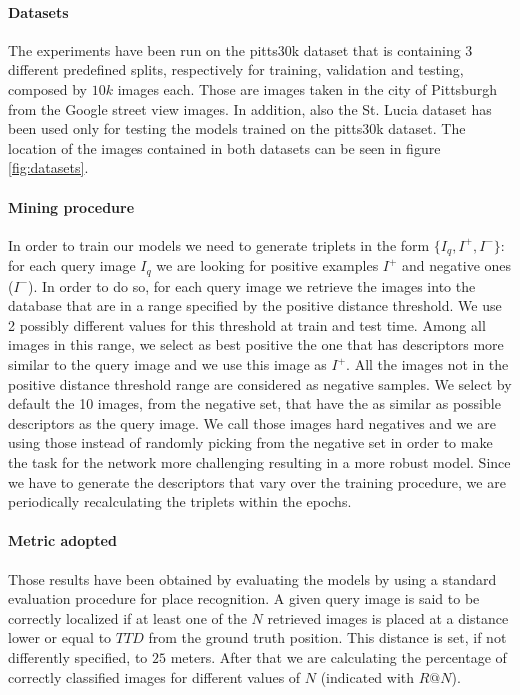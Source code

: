 \documentclass[10pt,twocolumn,letterpaper]{article}
\begin{document}
\paragraph{Datasets}
The experiments have been run on the pitts30k dataset \cite{NETVLAD} that is containing 3 different predefined splits, respectively for 
training, validation and testing, composed by $10k$ images each. Those are images taken in the city of Pittsburgh from the Google street
view images. In addition, also the St. Lucia dataset \cite{st_lucia} has been used only for testing the models trained on the pitts30k dataset.
The location of the images contained in both datasets can be seen in figure \ref{fig:datasets}.

\paragraph{Mining procedure}
In order to train our models we need to generate triplets in the form $\{I_q, I^+, I^-\}$: for each query image $I_q$ we are looking for
positive examples $I^+$ and negative ones ($I^-$). In order to do so, for each query image we retrieve the images into the database that are
in a range specified by the positive distance threshold. We use 2 possibly different values for this threshold at train and test time.
Among all images in this range, we select as best positive the one that has descriptors more similar to the query image and we use this image
as $I^+$. All the images not in the positive distance threshold range are considered as negative samples. We select by default the 10 
images, from the negative set, that have the as similar as possible descriptors as the query image. We call those images hard negatives and
we are using those instead of randomly picking from the negative set in order to make the task for the network more challenging resulting in 
a more robust model. Since we have to generate the descriptors that vary over the training procedure, we are periodically recalculating the 
triplets within the epochs.

\paragraph{Metric adopted}
Those results have been obtained by evaluating the models by using a standard evaluation procedure for place recognition.
A given query image is said to be correctly localized if at least one of the $N$ retrieved images is placed at a distance lower
or equal to $TTD$ from the ground truth position. This distance is set, if not differently specified, to $25$ meters. After
that we are calculating the percentage of correctly classified images for different values of $N$ (indicated with $R@N$).  
\end{document}

